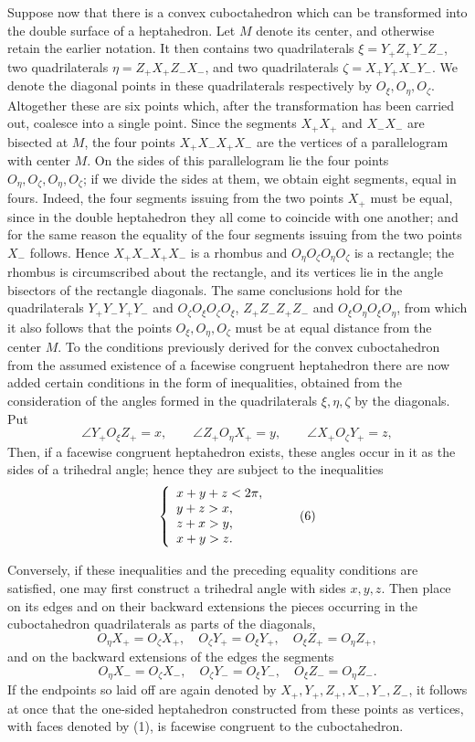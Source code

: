 \documentclass[11pt,a4paper]{article}
\begin{document}
Suppose now that there is a convex cuboctahedron which can be transformed into the double surface of a heptahedron. Let $M$ denote its center, and otherwise retain the earlier notation. It then contains two quadrilaterals $\xi=Y_+Z_+Y_-Z_-$, two quadrilaterals $\eta=Z_+X_+Z_-X_-$, and two quadrilaterals $\zeta=X_+Y_+X_-Y_-$. We denote the diagonal points in these quadrilaterals respectively by $O_\xi,O_\eta,O_\zeta$. Altogether these are six points which, after the transformation has been carried out, coalesce into a single point. Since the segments $X_+X_+$ and $X_-X_-$ are bisected at $M$, the four points $X_+X_-X_+X_-$ are the vertices of a parallelogram with center $M$. On the sides of this parallelogram lie the four points $O_\eta,O_\zeta,O_\eta,O_\zeta$; if we divide the sides at them, we obtain eight segments, equal in fours. Indeed, the four segments issuing from the two points $X_+$ must be equal, since in the double heptahedron they all come to coincide with one another; and for the same reason the equality of the four segments issuing from the two points $X_-$ follows. Hence $X_+X_-X_+X_-$ is a rhombus and $O_\eta O_\zeta O_\eta O_\zeta$ is a rectangle; the rhombus is circumscribed about the rectangle, and its vertices lie in the angle bisectors of the rectangle diagonals. The same conclusions hold for the quadrilaterals $Y_+Y_-Y_+Y_-$ and $O_\zeta O_\xi O_\zeta O_\xi$, $Z_+Z_-Z_+Z_-$ and $O_\xi O_\eta O_\xi O_\eta$, from which it also follows that the points $O_\xi,O_\eta,O_\zeta$ must be at equal distance from the center $M$. To the conditions previously derived for the convex cuboctahedron from the assumed existence of a facewise congruent heptahedron there are now added certain conditions in the form of inequalities, obtained from the consideration of the angles formed in the quadrilaterals $\xi,\eta,\zeta$ by the diagonals. Put
\[
\angle Y_+O_\xi Z_+=x,
\qquad \angle Z_+O_\eta X_+=y,
\qquad \angle X_+O_\zeta Y_+=z,
\tag{5}
\]
Then, if a facewise congruent heptahedron exists, these angles occur in it as the sides of a trihedral angle; hence they are subject to the inequalities
\[
\left\{
\begin{array}{l}
 x+y+z<2\pi,\vphantom{\Large A}\\
 y+z>x,\\
 z+x>y,\\
 x+y>z.
\end{array}
\right.\tag{6}
\]

Conversely, if these inequalities and the preceding equality conditions are satisfied, one may first construct a trihedral angle with sides $x,y,z$. Then place on its edges and on their backward extensions the pieces occurring in the cuboctahedron quadrilaterals as parts of the diagonals,
\[
O_\eta X_+=O_\zeta X_+,
\quad O_\zeta Y_+=O_\xi Y_+,
\quad O_\xi Z_+=O_\eta Z_+,
\]
and on the backward extensions of the edges the segments
\[
O_\eta X_-=O_\zeta X_-,
\quad O_\zeta Y_-=O_\xi Y_-,
\quad O_\xi Z_-=O_\eta Z_-.
\]
If the endpoints so laid off are again denoted by $X_+,Y_+,Z_+,X_-,Y_-,Z_-$, it follows at once that the one-sided heptahedron constructed from these points as vertices, with faces denoted by (1), is facewise congruent to the cuboctahedron.
\end{document}
